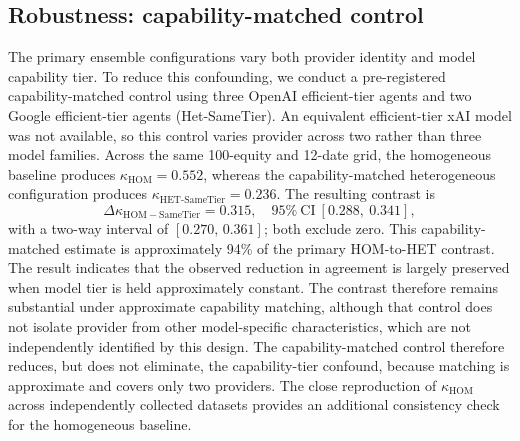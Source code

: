 \documentclass{ieeeaccess}
\begin{document}
\subsection{Robustness: capability-matched control}
\label{sec:control}
The primary ensemble configurations vary both provider identity and model
capability tier. To reduce this confounding, we conduct a pre-registered
capability-matched control using three OpenAI efficient-tier agents and two
Google efficient-tier agents (Het-SameTier). An equivalent efficient-tier xAI
model was not available, so this control varies provider across two rather than
three model families. Across the same 100-equity and 12-date grid, the
homogeneous baseline produces $\kappa_{\mathrm{HOM}}=0.552$, whereas the
capability-matched heterogeneous configuration produces
$\kappa_{\mathrm{HET\text{-}SameTier}}=0.236$. The resulting contrast is
\[
\Delta\kappa_{\mathrm{HOM-SameTier}}=0.315,\quad
95\%\ \mathrm{CI}\ [0.288,\ 0.341],
\]
with a two-way interval of $[0.270,\,0.361]$; both exclude zero. This capability-matched estimate is approximately 94\% of
the primary HOM-to-HET contrast. The result indicates that the observed
reduction in agreement is largely preserved when model tier is held approximately
constant. The contrast therefore remains substantial under approximate
capability matching, although that control does not isolate provider from other
model-specific characteristics, which are not independently identified by this
design. The capability-matched control therefore reduces, but does not eliminate,
the capability-tier confound, because matching is approximate and covers only two
providers. The close reproduction of $\kappa_{\mathrm{HOM}}$ across independently
collected datasets provides an additional consistency check for the homogeneous
baseline.
\end{document}
